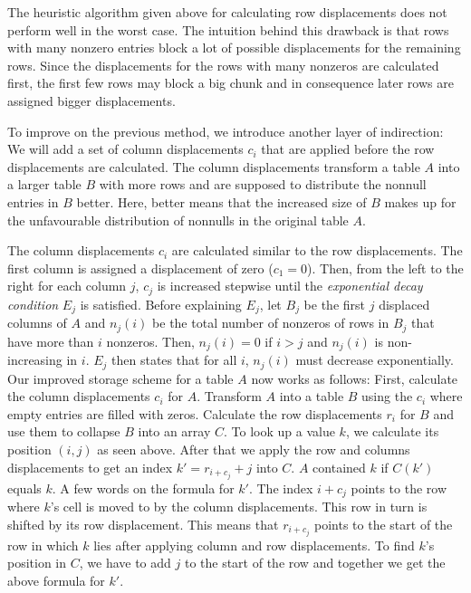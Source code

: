 The heuristic algorithm given above for calculating row displacements does not perform well in the worst case.
The intuition behind this drawback is that rows with many nonzero entries block a lot of possible displacements for the remaining rows.
Since the displacements for the rows with many nonzeros are calculated first, the first few rows may block a big chunk and in consequence later rows are assigned bigger displacements.

To improve on the previous method, we introduce another layer of indirection:
We will add a set of column displacements $c_i$ that are applied before the row displacements are calculated.
The column displacements transform a table $A$ into a larger table $B$ with more rows and are supposed to distribute the nonnull entries in $B$ better.
Here, better means that the increased size of $B$ makes up for the unfavourable distribution of nonnulls in the original table $A$.

The column displacements $c_i$ are calculated similar to the row displacements.
The first column is assigned a displacement of zero ($c_1 = 0$).
Then, from the left to the right for each column $j$, $c_j$ is increased stepwise until the \emph{exponential decay condition} $E_j$ is satisfied.
Before explaining $E_j$, let $B_j$ be the first $j$ displaced columns of $A$ and $n_j(i)$ be the total number of nonzeros of rows in $B_j$ that have more than $i$ nonzeros.
Then, $n_j(i) = 0$ if $i > j$ and $n_j(i)$ is non-increasing in $i$.
$E_j$ then states that for all $i$, $n_j(i)$ must decrease exponentially.
Our improved storage scheme for a table $A$ now works as follows:
First, calculate the column displacements $c_i$ for $A$.
Transform $A$ into a table $B$ using the $c_i$ where empty entries are filled with zeros.
Calculate the row displacements $r_i$ for $B$ and use them to collapse $B$ into an array $C$.
To look up a value $k$, we calculate its position $(i, j)$ as seen above.
After that we apply the row and columns displacements to get an index $k' = r_{i + c_j} + j$ into $C$.
$A$ contained $k$ if $C(k')$ equals $k$.
A few words on the formula for $k'$.
The index $i + c_j$ points to the row where $k$'s cell is moved to by the column displacements.
This row in turn is shifted by its row displacement.
This means that $r_{i + c_j}$ points to the start of the row in which $k$ lies after applying column and row displacements.
To find $k$'s position in $C$, we have to add $j$ to the start of the row and together we get the above formula for $k'$.

